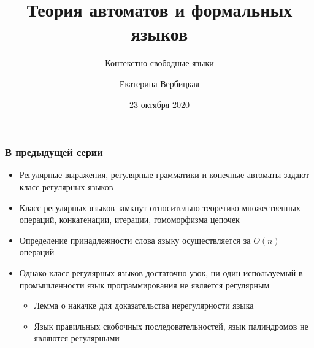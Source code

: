 \documentclass{beamer}
\title[]{Теория автоматов и формальных языков}
\subtitle[]{Контекстно-свободные языки}
\institute[]{
Санкт-Петербургский государственный электротехнический университет <<ЛЭТИ>>\\
}
\author[]{Екатерина Вербицкая}
\date{23 октября 2020}
\begin{document}
{
  \begin{frame}
    \titlepage
  \end{frame}
}


\begin{frame}[fragile]
  \transwipe[direction=90]
  \frametitle{В предыдущей серии}
  \begin{itemize}
    \item Регулярные выражения, регулярные грамматики и конечные автоматы задают класс регулярных языков
    \item Класс регулярных языков замкнут относительно теоретико-множественных операций, конкатенации, итерации, гомоморфизма цепочек
    \item Определение принадлежности слова языку осуществляется за $O(n)$ операций
    \item Однако класс регулярных языков достаточно узок, ни один используемый в промышленности язык программирования не является регулярным
    \begin{itemize}
      \item Лемма о накачке для доказательства нерегулярности языка
      \item Язык правильных скобочных последовательностей, язык палиндромов не являются регулярными
    \end{itemize}
  \end{itemize}
\end{frame}
\end{document}

